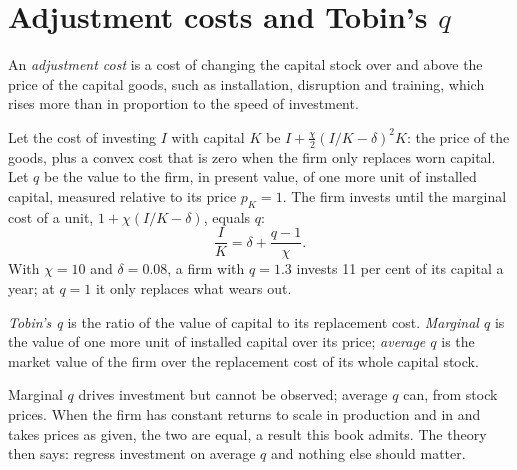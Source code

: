 \section{Adjustment costs and Tobin's \texorpdfstring{$q$}{q}}\label{sec:b2:investment:q}

\begin{definition}\label{def:b2:investment:adjustment-cost}
An \emph{adjustment cost} is a cost of changing the capital stock over and above the price of the
capital goods, such as installation, disruption and training, which rises more than in proportion to the speed of
investment.
\end{definition}

Let the cost of investing $I$ with capital $K$ be $I + \tfrac{\chi}{2}(I/K - \delta)^2K$: the price of the goods, plus a convex cost that is zero when the firm only replaces
worn capital. Let $q$ be the value to the firm, in present value, of one more unit of installed capital, measured relative to
its price $p_K = 1$. The firm invests until the marginal cost of a unit, $1 + \chi(I/K - \delta)$, equals $q$:
\begin{equation}\label{eq:b2:investment:q}
\frac{I}{K} = \delta + \frac{q - 1}{\chi}.
\end{equation}
With $\chi = 10$ and $\delta = 0.08$, a firm with $q = 1.3$ invests 11 per cent of its capital a year; at $q = 1$ it only replaces what wears out.

\begin{definition}[Tobin's q]\label{def:b2:investment:tobins-q}
\emph{Tobin's q} is the ratio of the value of capital to its replacement cost. \emph{Marginal $q$} is the value
of one more unit of installed capital over its price; \emph{average $q$} is the market value of the firm over the
replacement cost of its whole capital stock.
\end{definition}

Marginal $q$ drives investment but cannot be observed; average $q$ can, from stock prices. When the firm has constant returns to
scale in production and in  and takes prices as given, the two are equal, a result this book
admits. The theory then says: regress investment on average $q$ and nothing else should matter.

